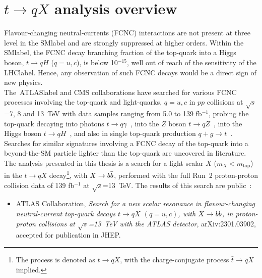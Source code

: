 \chapter{$t\to qX$ analysis overview}
\label{chapter:tqXanalysis}

Flavour-changing neutral-currents (FCNC) interactions are not present at three level in the \acrshort{SMlabel} and are strongly suppressed at higher orders. Within the \acrshort{SMlabel}, the FCNC decay branching fraction of the top-quark into a Higgs boson, $t\to qH$ ($q=u,c$), is below 10$^{-15}$, well out of reach of the sensitivity of the \acrshort{LHClabel}. Hence, any observation of such FCNC decays would be a direct sign of new physics.\\

The~\acrshort{ATLASlabel} and CMS collaborations have searched for various FCNC processes involving the top-quark and light-quarks, $q=u,c$ in $pp$ collisions at $\sqrt{s}$=7, 8 and 13~TeV with data samples ranging from 5.0 to 139 fb$^{-1}$, probing the top-quark decaying into photons $t\to q\gamma$~\cite{ATLAStqgamma,tqgamma2020,CMStqgamma,Tumasyan_2022}, into the $Z$ boson $t\to qZ$~\cite{Sirunyan_2017,tqZ2018,ATLAS-CONF-2021-049,CMStqZ}, into the Higgs boson $t\to qH$~\cite{ATLAStqHtautau,TOPQ-2017-07,CMStqHRun2,Khachatryan_2017}, and also in single top-quark production $q+g\to t$~\cite{tqgluon2016,tqgluon2021,tqgluon2017CMS}. Searches for similar signatures involving a FCNC decay of the top-quark into a beyond-the-SM particle lighter than the top-quark are uncovered in literature.\\

The analysis presented in this thesis is a search for a light scalar $X$ ($m_X < m_\text{top}$) in the $t\to qX$ decay\footnote{The process is denoted as $t\to qX$, with the charge-conjugate process $\bar{t}\to\bar{q}X$ implied.}, with $X\to b\bar{b}$, performed with the full Run~2 proton-proton collision data of 139 fb$^{-1}$ at $\sqrt{s}$=13~TeV. The results of this search are public~\cite{ATLAS:2023mcc}:

\begin{itemize}
    \item ATLAS Collaboration, \textit{Search for a new scalar resonance in flavour-changing neutral-current top-quark decays $t\to qX$ $(q=u,c)$, with $X\to b\bar{b}$, in proton-proton collisions at $\sqrt{s}$=13~TeV with the ATLAS detector}, arXiv:2301.03902, accepted for publication in JHEP.

\end{itemize}

